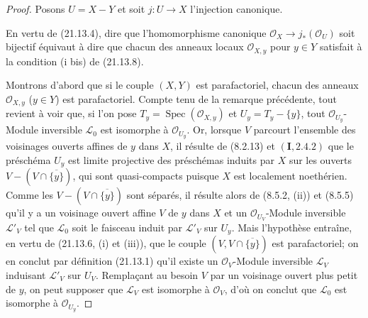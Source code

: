 \begin{proof}
Posons $U=X-Y$ et soit $j:U\to X$ l'injection canonique.

En vertu de (21.13.4), dire que l'homomorphisme canonique
$\mathcal O_X\to j_*(\mathcal O_U)$ soit bijectif équivaut à dire que chacun des
anneaux locaux $\mathcal O_{X,y}$ pour $y\in Y$ satisfait à la condition (i bis) de
(21.13.8).

Montrons d'abord que si le couple $(X,Y)$ est parafactoriel, chacun des anneaux
$\mathcal O_{X,y}$ ($y\in Y$) est parafactoriel. Compte tenu de la remarque
précédente, tout revient à voir que, si l'on pose
$T_y=\operatorname{Spec}(\mathcal O_{X,y})$ et $U_y=T_y-\{y\}$, tout
$\mathcal O_{U_y}$-Module inversible $\mathscr L_0$ est isomorphe à
$\mathcal O_{U_y}$. Or, lorsque $V$ parcourt l'ensemble des voisinages ouverts
affines de $y$ dans $X$, il résulte de (8.2.13) et $(\mathbf I, 2.4.2)$ que le
préschéma $U_y$ est limite projective des préschémas induits par $X$ sur les ouverts
$V-(V\cap\overline{\{y\}})$, qui sont quasi-compacts puisque $X$ est localement
noethérien. Comme les $V-(V\cap\overline{\{y\}})$ sont séparés, il résulte alors de
(8.5.2, (ii)) et (8.5.5) qu'il y a un voisinage ouvert affine $V$ de $y$ dans $X$ et
un $\mathcal O_{U_V}$-Module inversible $\mathscr L'_V$ tel que $\mathscr L_0$ soit le
faisceau induit par $\mathscr L'_V$ sur $U_y$. Mais l'hypothèse entraîne, en vertu de
(21.13.6, (i) et (iii)), que le couple $(V,V\cap\overline{\{y\}})$ est parafactoriel;
on en conclut par définition (21.13.1) qu'il existe un $\mathcal O_V$-Module inversible
$\mathscr L_V$ induisant $\mathscr L'_V$ sur $U_V$. Remplaçant au besoin $V$ par un
voisinage ouvert plus petit de $y$, on peut supposer que $\mathscr L_V$ est isomorphe
à $\mathcal O_V$, d'où on conclut que $\mathscr L_0$ est isomorphe à
$\mathcal O_{U_y}$.


\end{proof}
